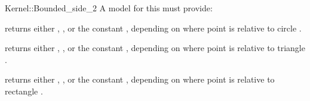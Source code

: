 \begin{ccRefFunctionObjectConcept}{Kernel::Bounded_side_2}
A model for this must provide:


{returns either ,
 , or the constant
 , depending on where point  is relative to
circle .}

{returns either ,
 , or the constant
 , depending on where point  is relative to
triangle .}

{returns either ,
 , or the constant
 , depending on where point  is relative to
rectangle .}

\end{ccRefFunctionObjectConcept}
